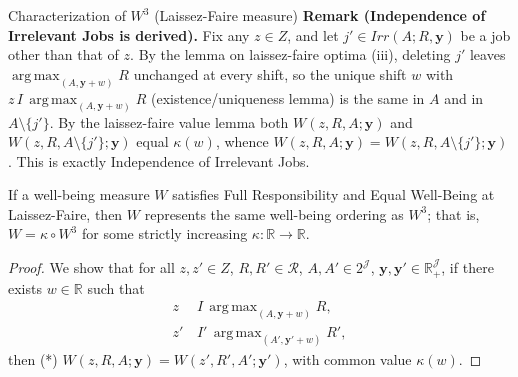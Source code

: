 \documentclass[10pt]{beamer}
\DeclareMathOperator*{\argmax}{arg\,max}
\begin{document}
\begin{frame}[allowframebreaks]{Characterization of $W^3$ (Laissez-Faire measure)}
\medskip\textbf{Remark (Independence of Irrelevant Jobs is derived).}\quad
Fix any $z\in Z$, and let $j'\in Irr(A;R,\mathbf y)$ be a job other than that of
$z$. By the lemma on
laissez-faire optima (iii), deleting $j'$ leaves $\argmax_{(A,\mathbf y+w)}R$
unchanged at every shift, so the unique shift $w$ with
$z\,I\,\argmax_{(A,\mathbf y+w)}R$ (existence/uniqueness lemma) is the same in
$A$ and in $A\setminus\{j'\}$. By the laissez-faire value lemma both
$W(z,R,A;\mathbf y)$ and $W(z,R,A\setminus\{j'\};\mathbf y)$ equal $\kappa(w)$,
whence $W(z,R,A;\mathbf y)=W(z,R,A\setminus\{j'\};\mathbf y)$. This is exactly
Independence of Irrelevant Jobs.

\begin{theorem}
If a well-being measure $W$ satisfies Full Responsibility and Equal Well-Being
at Laissez-Faire, then $W$ represents the same well-being ordering as $W^3$; that
is, $W=\kappa\circ W^3$ for some strictly increasing
$\kappa:\mathbb R\to\mathbb R$.
\end{theorem}
\begin{proof}
We show that for all $z,z'\in Z$, $R,R'\in\mathcal R$, $A,A'\in 2^{\mathcal J}$,
$\mathbf y,\mathbf y'\in\mathbb R_+^{\mathcal J}$, if there exists
$w\in\mathbb R$ such that
\begin{align*}
z\,&I\,\argmax_{(A,\mathbf y+w)}R,\\
z'\,&I'\,\argmax_{(A',\mathbf y'+w)}R',\end{align*}
then (*) $W(z,R,A;\mathbf y)=W(z',R',A';\mathbf y')$, with common value
$\kappa(w)$.


\end{proof}
\end{frame}
\end{document}
